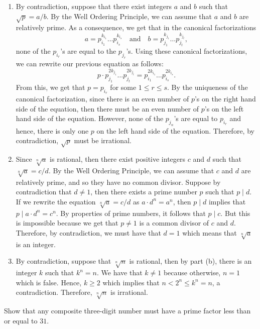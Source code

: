 \begin{solution}
    \begin{enumerate}
        \item By contradiction, suppose that there exist integers $a$ and $b$ such that $\sqrt{p} = a/b$. By the Well Ordering Principle, we can assume that $a$ and $b$ are relatively prime. As a consequence, we get that in the canonical factorizations 
        $$a = p_{i_1}^{k_{i_1}} \dots p_{i_s}^{k_{i_s}} \quad  \text{and} \quad b = p_{j_1}^{k_{j_1}} \dots p_{j_t}^{k_{j_t}},$$
        none of the $p_{i_r}$'s are equal to the $p_{j_r}$'s. Using these canonical factorizations, we can rewrite our previous equation as follows:
        $$p \cdot p_{j_1}^{2k_{j_1}} \dots p_{j_t}^{2k_{j_t}} = p_{i_1}^{2k_{i_1}} \dots p_{i_s}^{2k_{i_s}}.$$
        From this, we get that $p = p_{i_r}$ for some $1 \leq r \leq s$. By the uniqueness of the canonical factorization, since there is an even number of $p$'s on the right hand side of the equation, then there must be an even number of $p$'s on the left hand side of the equation. However, none of the $p_{j_n}$'s are equal to $p_{i_r}$ and hence, there is only one $p$ on the left hand side of the equation. Therefore, by contradiction, $\sqrt{p}$ must be irrational.
        \item Since $\sqrt[n]{a}$ is rational, then there exist positive integers $c$ and $d$ such that $\sqrt[n]{a} = c/d$. By the Well Ordering Principle, we can assume that $c$ and $d$ are relatively prime, and so they have no common divisor. Suppose by contradiction that $d \neq 1$, then there exists a prime number $p$ such that $p \mid d$. If we rewrite the equation $\sqrt[n]{a} = c/d$ as $a \cdot d^n = a^n$, then $p \mid d$ implies that $p \mid a \cdot d^n = c^n$. By properties of prime numbers, it follows that $p \mid c$. But this is impossible because we get that $p \neq 1$ is a common divisor of $c$ and $d$. Therefore, by contradiction, we must have that $d = 1$ which means that $\sqrt[n]{a}$ is an integer.
        \item By contradiction, suppose that $\sqrt[n]{n}$ is rational, then by part (b), there is an integer $k$ such that $k^n = n$. We have that $k \neq 1$ because otherwise, $n = 1$ which is false. Hence, $k \geq 2$ which implies that $n < 2^n \leq k^n = n$, a contradiction. Therefore, $\sqrt[n]{n}$ is irrational.
    \end{enumerate}
\end{solution}

\begin{exercise}
    Show that any composite three-digit number must have a prime factor less than or equal to $31$. \\
\end{exercise}

